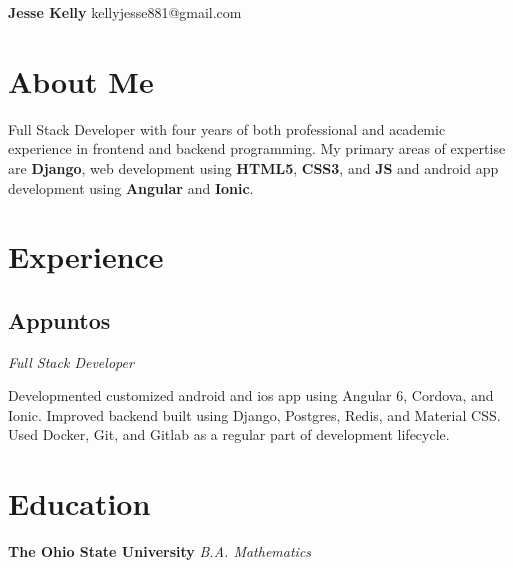 \documentclass[letterpaper,11pt]{article}
\begin{document}
\begin{flushleft}
\Large\textbf{Jesse Kelly}
\newline
kellyjesse881@gmail.com
\end{flushleft}

\section{About Me}
Full Stack Developer with four years of both
professional and academic experience in frontend
and backend programming. My primary areas of
expertise are \textbf{Django}, web development using \textbf{HTML5},
\textbf{CSS3}, and \textbf{JS} and android app development using
\textbf{Angular} and \textbf{Ionic}.

\section{Experience}
\subsection{Appuntos}
\textit{Full Stack Developer}

Developmented customized android and ios
app using Angular 6, Cordova, and Ionic.
Improved backend built using Django,
Postgres, Redis, and Material CSS. Used
Docker, Git, and Gitlab as a regular part
of development lifecycle.

\section{Education}
\textbf{The Ohio State University}
\newline
\textit{B.A. Mathematics}
\end{document}
